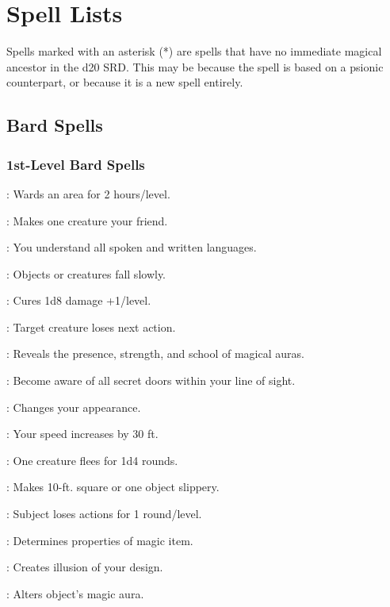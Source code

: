 \section{Spell Lists}
\label{sec:Spells}
Spells marked with an asterisk (*) are spells that have no immediate magical ancestor in the d20 SRD.
This may be because the spell is based on a psionic counterpart, or because it is a new spell entirely.
\subsection{Bard Spells}
\label{sec:BardSpells}
\subsubsection{1st-Level Bard Spells}
\begin{list}{}{\leftmargin=1em}
\item {}: Wards an area for 2 hours/level.
\item {}: Makes one creature your friend.
\item {}: You understand all spoken and written languages.
\item {}: Objects or creatures fall slowly.
\item {}: Cures 1d8 damage +1/level.
\item {}: Target creature loses next action.
\item {}: Reveals the presence, strength, and school of magical auras.
\item {}: Become aware of all secret doors within your line of sight.
\item {}: Changes your appearance.
\item {}: Your speed increases by 30 ft.
\item {}: One creature flees for 1d4 rounds.
\item {}: Makes 10-ft. square or one object slippery.
\item {}: Subject loses actions for 1 round/level.
\item {}: Determines properties of magic item.
\item {}: Creates illusion of your design.
\item {}: Alters object's magic aura.

\end{list}
